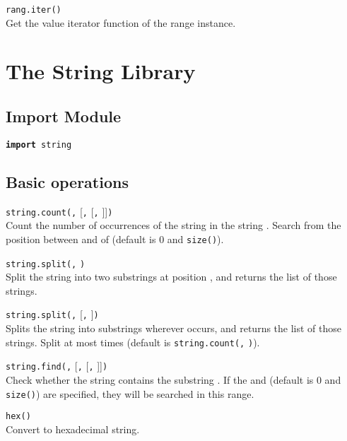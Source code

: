 \hangpar \texttt{rang.iter()}\\
Get the value iterator function of the range instance. 

\section*{The String Library}

\subsection*{Import Module}

\hangpar \texttt{\textbf{import} string}

\subsection*{Basic operations}

\hangpar \texttt{string.count(}\texttt{,} [\texttt{,} [\texttt{,} ]]\texttt{)}\\
Count the number of occurrences of the  string in the string . Search from the position between  and  of  (default is $0$ and \texttt{size(}\texttt{)}).

\hangpar \texttt{string.split(}\texttt{,} \texttt{)}\\
Split the string  into two substrings at position , and returns the list of those strings.

\hangpar \texttt{string.split(}\texttt{,} [\texttt{,} ]\texttt{)}\\
Splits the string  into substrings wherever  occurs, and returns the list of those strings. Split at most  times (default is \texttt{string.count(}\texttt{,} \texttt{)}).

\hangpar \texttt{string.find(}\texttt{,} [\texttt{,} [\texttt{,} ]]\texttt{)}\\
Check whether the string  contains the substring . If the  and  (default is $0$ and \texttt{size(}\texttt{)}) are specified, they will be searched in this range.

\hangpar \texttt{hex(}\texttt{)}\\
Convert  to hexadecimal string.

